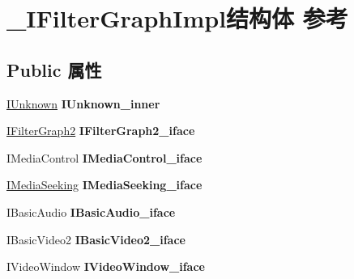 \hypertarget{struct___i_filter_graph_impl}{}\section{\+\_\+\+I\+Filter\+Graph\+Impl结构体 参考}
\label{struct___i_filter_graph_impl}
\subsection*{Public 属性}
\begin{DoxyCompactItemize}
\item 
\mbox{\label{struct___i_filter_graph_impl_a4fb97df2d5ef63c9d2024b7640786e4e}} 
\hyperlink{interface_i_unknown}{I\+Unknown} {\bfseries I\+Unknown\+\_\+inner}
\item 
\mbox{\label{struct___i_filter_graph_impl_af00875e9b56fcc773a2681df4267d42e}} 
\hyperlink{interface_i_filter_graph2}{I\+Filter\+Graph2} {\bfseries I\+Filter\+Graph2\+\_\+iface}
\item 
\mbox{\label{struct___i_filter_graph_impl_a3b5b36888b7d808d2d1629fb797802eb}} 
I\+Media\+Control {\bfseries I\+Media\+Control\+\_\+iface}
\item 
\mbox{\label{struct___i_filter_graph_impl_ab78040ebbcb6fed4bded1b16c272148f}} 
\hyperlink{interface_i_media_seeking}{I\+Media\+Seeking} {\bfseries I\+Media\+Seeking\+\_\+iface}
\item 
\mbox{\label{struct___i_filter_graph_impl_ab065644c17ec77d21d5f765ff57d1991}} 
I\+Basic\+Audio {\bfseries I\+Basic\+Audio\+\_\+iface}
\item 
\mbox{\label{struct___i_filter_graph_impl_acc927e00b191b79f2e1309bdc57f993e}} 
I\+Basic\+Video2 {\bfseries I\+Basic\+Video2\+\_\+iface}
\item 
\mbox{\label{struct___i_filter_graph_impl_a0cbeb2a6254d761dd7532acb3795b59e}} 
I\+Video\+Window {\bfseries I\+Video\+Window\+\_\+iface}
\item 
\mbox{\label{struct___i_filter_graph_impl_ad9af2bfa288c0410a39e31dcc345ff4d}} 

\end{DoxyCompactItemize}
